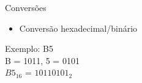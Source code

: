 

\begin{frame}{Conversões}
    \begin{itemize}
        \item Conversão hexadecimal/binário
    \end{itemize}
    Exemplo: B5 \\[0.2cm]
    \centering
    B = 1011, 5 = 0101 \\[0.2cm]
    $B5_{16}$ = $10110101_{2}$ \\[0.2cm]
\end{frame}